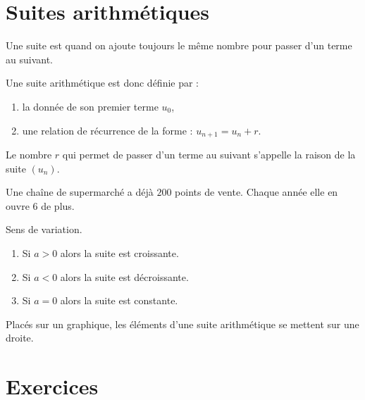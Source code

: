 
\section{Suites arithmétiques}

\begin{definition}
    Une suite est  quand on ajoute toujours le même nombre pour passer d'un terme au suivant.

Une suite arithmétique est donc définie par :
\begin{enumerate}
    \item
la donnée de son premier terme \( u_0\),
\item
une relation de récurrence de la forme : $u_{n+1}=u_n+r$.
\end{enumerate}
Le nombre $r$ qui permet de passer d'un terme au suivant s'appelle la raison de la suite \( (u_n)\).
\end{definition}

\begin{example}
    Une chaîne de supermarché a déjà \( 200\) points de vente. Chaque année elle en ouvre \( 6\) de plus.
\end{example}

\begin{Aretenir}
    Sens de variation.
    \begin{enumerate}
        \item
            Si \( a>0\) alors la suite est croissante.
        \item
            Si \( a<0\) alors la suite est décroissante.
        \item
            Si \( a=0\) alors la suite est constante.
    \end{enumerate}
\end{Aretenir}

\begin{Aretenir}
Placés sur un graphique, les éléments d'une suite arithmétique se mettent sur une droite.
\end{Aretenir}

\section{Exercices}

